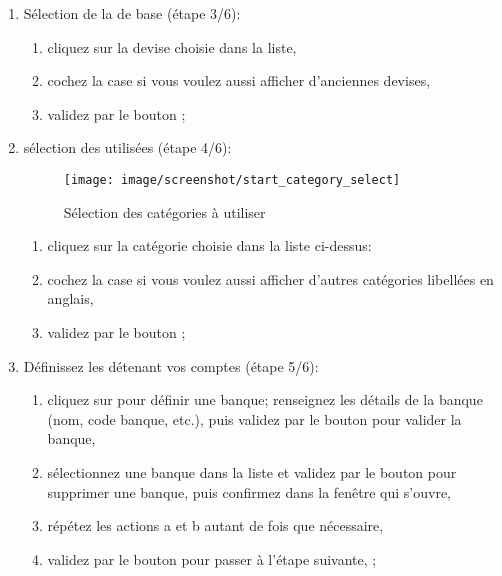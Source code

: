 \begin{enumerate}
	\item Sélection de la  de base (étape 3/6):
		\begin{enumerate} 
		 	\item cliquez sur la devise choisie dans la liste,
			\item cochez la case  si vous voulez aussi afficher d'anciennes devises,
			\item validez par le bouton ;
		\end{enumerate}

	\item sélection des  utilisées (étape 4/6):
	
	\begin{figure}[htbp]
	\begin{center}
		\texttt{[image: image/screenshot/start\_category\_select]}
	\end{center}
	\caption{Sélection des catégories à utiliser}
	\label{start_category_select}
	\end{figure}
		
		\begin{enumerate} 
		 	\item cliquez sur la catégorie choisie dans la liste ci-dessus:
			\item cochez la case  si vous voulez aussi afficher d'autres catégories libellées en anglais,
			\item validez par le bouton ;
		\end{enumerate}		

	\item Définissez les  détenant vos comptes (étape 5/6):
		\begin{enumerate} 
		 	\item cliquez sur  pour définir une banque; renseignez les détails de la banque (nom, code banque, etc.), puis validez par le bouton  pour valider la banque,
			\item sélectionnez une banque dans la liste et validez par le bouton  pour supprimer une banque, puis confirmez dans la fenêtre qui s'ouvre,
			\item répétez les actions a et b autant de fois que nécessaire,
			\item validez par le bouton  pour passer à l'étape suivante, ;
		\end{enumerate}		 	


\end{enumerate}
